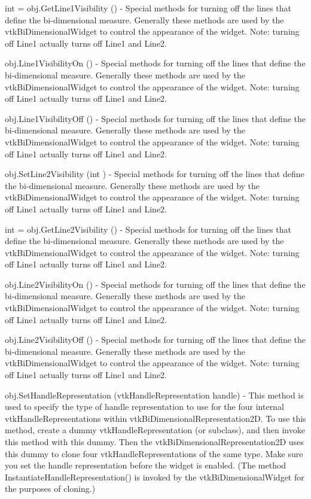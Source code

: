 \begin{DoxyItemize}
\item {\ttfamily int = obj.\-Get\-Line1\-Visibility ()} -\/ Special methods for turning off the lines that define the bi-\/dimensional measure. Generally these methods are used by the vtk\-Bi\-Dimensional\-Widget to control the appearance of the widget. Note\-: turning off Line1 actually turns off Line1 and Line2.  
\item {\ttfamily obj.\-Line1\-Visibility\-On ()} -\/ Special methods for turning off the lines that define the bi-\/dimensional measure. Generally these methods are used by the vtk\-Bi\-Dimensional\-Widget to control the appearance of the widget. Note\-: turning off Line1 actually turns off Line1 and Line2.  
\item {\ttfamily obj.\-Line1\-Visibility\-Off ()} -\/ Special methods for turning off the lines that define the bi-\/dimensional measure. Generally these methods are used by the vtk\-Bi\-Dimensional\-Widget to control the appearance of the widget. Note\-: turning off Line1 actually turns off Line1 and Line2.  
\item {\ttfamily obj.\-Set\-Line2\-Visibility (int )} -\/ Special methods for turning off the lines that define the bi-\/dimensional measure. Generally these methods are used by the vtk\-Bi\-Dimensional\-Widget to control the appearance of the widget. Note\-: turning off Line1 actually turns off Line1 and Line2.  
\item {\ttfamily int = obj.\-Get\-Line2\-Visibility ()} -\/ Special methods for turning off the lines that define the bi-\/dimensional measure. Generally these methods are used by the vtk\-Bi\-Dimensional\-Widget to control the appearance of the widget. Note\-: turning off Line1 actually turns off Line1 and Line2.  
\item {\ttfamily obj.\-Line2\-Visibility\-On ()} -\/ Special methods for turning off the lines that define the bi-\/dimensional measure. Generally these methods are used by the vtk\-Bi\-Dimensional\-Widget to control the appearance of the widget. Note\-: turning off Line1 actually turns off Line1 and Line2.  
\item {\ttfamily obj.\-Line2\-Visibility\-Off ()} -\/ Special methods for turning off the lines that define the bi-\/dimensional measure. Generally these methods are used by the vtk\-Bi\-Dimensional\-Widget to control the appearance of the widget. Note\-: turning off Line1 actually turns off Line1 and Line2.  
\item {\ttfamily obj.\-Set\-Handle\-Representation (vtk\-Handle\-Representation handle)} -\/ This method is used to specify the type of handle representation to use for the four internal vtk\-Handle\-Representations within vtk\-Bi\-Dimensional\-Representation2\-D. To use this method, create a dummy vtk\-Handle\-Representation (or subclass), and then invoke this method with this dummy. Then the vtk\-Bi\-Dimensional\-Representation2\-D uses this dummy to clone four vtk\-Handle\-Representations of the same type. Make sure you set the handle representation before the widget is enabled. (The method Instantiate\-Handle\-Representation() is invoked by the vtk\-Bi\-Dimensional\-Widget for the purposes of cloning.)  

\end{DoxyItemize}

